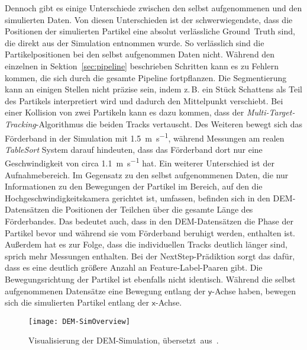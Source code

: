 Dennoch gibt es einige Unterschiede zwischen den selbst aufgenommenen und den simulierten Daten.
Von diesen Unterschieden ist der schwerwiegendste, dass die Positionen der simulierten Partikel eine absolut verlässliche Ground~Truth sind, 
die direkt aus der Simulation entnommen wurde.
So verlässlich sind die Partikelpositionen bei den selbst aufgenommen Daten nicht.
Während den einzelnen in Sektion~\ref{sec:pipeline} beschrieben Schritten kann es zu Fehlern kommen, die sich durch die gesamte Pipeline fortpflanzen.
Die Segmentierung kann an einigen Stellen nicht präzise sein, indem z.\,B. ein Stück Schattens als Teil des Partikels interpretiert wird und dadurch den Mittelpunkt verschiebt. 
Bei einer Kollision von zwei Partikeln kann es dazu kommen, dass der \textit{Multi-Target-Tracking}-Algorithmus die beiden Tracks vertauscht.  
Des Weiteren bewegt sich das Förderband in der Simulation mit \SI{1.5}{\meter\per\second}, 
während Messungen am realen \textit{TableSort} System darauf hindeuten, dass das Förderband dort nur eine Geschwindigkeit von 
circa \SI{1.1}{\meter\per\second} hat.
Ein weiterer Unterschied ist der Aufnahmebereich.
Im Gegensatz zu den selbst aufgenommenen Daten, die nur Informationen 
zu den Bewegungen der Partikel im Bereich, auf den die Hochgeschwindigkeitskamera gerichtet ist, umfassen, 
befinden sich in den DEM-Datensätzen die Positionen der Teilchen über die gesamte Länge des Förderbandes.
Das bedeutet auch, dass in den DEM-Datensätzen die Phase der Partikel bevor und während sie vom Förderband beruhigt werden, enthalten ist.
Außerdem hat es zur Folge, dass die individuellen Tracks deutlich länger sind, sprich mehr Messungen enthalten.
Bei der NextStep-Prädiktion sorgt das dafür, dass es eine deutlich größere Anzahl an Feature-Label-Paaren gibt.
Die Bewegungsrichtung der Partikel ist ebenfalls nicht identisch.
Während die selbst aufgenommenen Datensätze eine Bewegung entlang der \(\mathsf{y}\)-Achse haben, bewegen sich die simulierten Partikel entlang der \(\mathsf{x}\)-Achse.

\begin{figure}[h]
    \centering
	\texttt{[image: DEM-SimOverview]}
	\caption{Visualisierung der DEM-Simulation, übersetzt~aus~\cite{Pfaff2018}.}
	\label{fig:DEMSimulation}
\end{figure}



